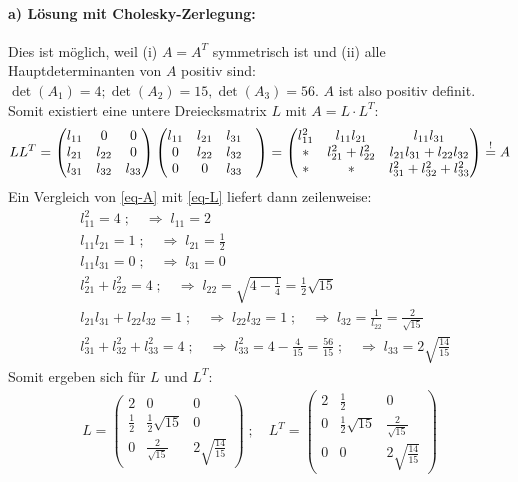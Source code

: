 \paragraph*{a) Lösung mit Cholesky-Zerlegung:}
Dies ist möglich, weil (i) $A = A^T$ symmetrisch ist und (ii) alle
Hauptdeterminanten von $A$ positiv sind:
$\det (A_1) = 4; \det (A_2) = 15, \det(A_3) = 56$. $A$ ist also positiv definit.
Somit existiert eine untere Dreiecksmatrix $L$ mit $A = L \cdot L^T$:
\begin{align}
\label{eq-L}
  L L^T = \begin{pmatrix}l_{11}&0&0\\l_{21}&l_{22}&0\\l_{31}&l_{32}&l_{33}\end{pmatrix}
  \begin{pmatrix}l_{11}&l_{21}&l_{31}\\0 &l_{22}&l_{32}\\0&0&l_{33}&\end{pmatrix} =
  \begin{pmatrix}l_{11}^2&l_{11}l_{21}&l_{11}l_{31}\\
  *&l_{21}^2+l_{22}^2&l_{21}l_{31}+l_{22}l_{32}\\
  *&*&l_{31}^2+l_{32}^2+l_{33}^2\end{pmatrix} \overset{!}{=} A
\end{align}
Ein Vergleich von \eqref{eq-A} mit \eqref{eq-L} liefert dann zeilenweise:
\begin{align*}
  & l_{11}^2 = 4 \;;\quad\Rightarrow\; l_{11} = 2\\
  & l_{11}l_{21} = 1 \;;\quad\Rightarrow\; l_{21} = \frac{1}{2}\\
  & l_{11}l_{31} = 0  \;;\quad\Rightarrow\;l_{31} = 0\\
  & l_{21}^2+l_{22}^2 = 4 \;;\quad\Rightarrow\; l_{22} = \sqrt{4 -\frac{1}{4}} = \frac{1}{2}\sqrt{15}\\
  & l_{21}l_{31}+l_{22}l_{32} = 1 \;;\quad\Rightarrow\; l_{22}l_{32} = 1
  \;;\quad\Rightarrow\; l_{32} = \frac{1}{l_{22}} = \frac{2}{\sqrt{15}}\\
  &l_{31}^2+l_{32}^2+l_{33}^2 = 4 \;;\quad\Rightarrow\;l_{33}^2 = 4 -\frac{4}{15} = \frac{56}{15}
  \;;\quad\Rightarrow\;l_{33} = 2 \sqrt{\frac{14}{15}}
\end{align*}
Somit ergeben sich für $L$ und $L^T$:
\begin{align}
L = \begin{pmatrix}2 & 0 & 0 \\
       \frac{1}{2} & \frac{1}{2}\sqrt{15} & 0 \\
       0 & \frac{2}{\sqrt{15}} &  2 \sqrt{\frac{14}{15}} \end{pmatrix} \; ;\quad
L^T = \begin{pmatrix}2 & \frac{1}{2} & 0 \\
      0 & \frac{1}{2}\sqrt{15} & \frac{2}{\sqrt{15}} \\
      0 & 0& 2 \sqrt{\frac{14}{15}}\end{pmatrix}
\end{align}
